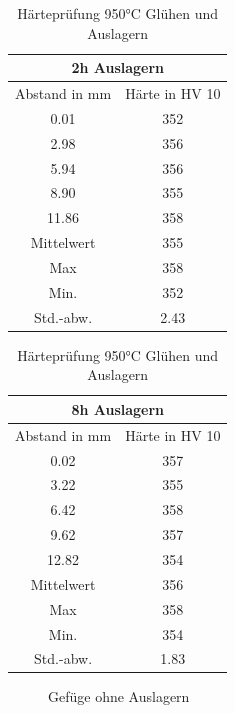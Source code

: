 \documentclass[a4paper, 11pt]{tubsreprt}
\begin{document}
\begin{table}[t] 	%
\begin{tabular}{c|c}
\multicolumn{2}{c}{2h Auslagern} \\
\hline
Abstand in mm	& Härte in HV 10 \\
0.01	&	352 \\
2.98	&	356 \\
5.94	&	356 \\
8.90	&	355 \\
11.86	&	358 \\
Mittelwert	&	355 \\
Max	&	358 \\
Min.	&	352 \\
Std.-abw.	&	2.43 \\

\end{tabular}
\begin{tabular}{c|c}
\multicolumn{2}{c}{8h Auslagern} \\
\hline
Abstand in mm	&	Härte in HV 10 \\
0.02	&	357 \\
3.22	&	355 \\
6.42	&	358 \\
9.62	&	357 \\
12.82	&	354 \\
Mittelwert	&	356 \\
Max	&	358 \\
Min.	&	354 \\
Std.-abw.	&	1.83 \\

\end{tabular}
\caption{Härteprüfung 950°C Glühen und Auslagern}
\label{950alterung}
\end{table}
\begin{figure} 		%
	\caption{Gefüge ohne Auslagern}
	\label{Gefüge ohne Alterung}
\end{figure}
\end{document}
